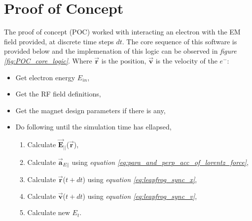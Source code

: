 \documentclass{article}
\begin{document}
\newcommand{\vecthreeBF}[1]{\vec{\textbf{#1}}}
\newcommand{\vecthree}[1]{\vec{#1}}

\newcommand{\parDeriv}[2]{\frac{\partial #1}{\partial #2}}
\newcommand{\parDerivS}[2]{\frac{\partial^2 #1}{\partial #2^2}}
\newcommand{\derivS}[2]{\frac{d^2 #1}{d#2^2}}

\newcommand{\dotProdBF}[2]{\vecthreeBF{#1} \cdot \vecthreeBF{#2}}
\newcommand{\dotProd}[2]{\vecthree{#1} \cdot \vecthree{#2}}

\newcommand{\crossProdBF}[2]{\vecthreeBF{#1} \times \vecthreeBF{#2}}
\newcommand{\crossProd}[2]{\vecthree{#1} \times \vecthree{#2}}


\newcommand{\fromeq}[1]{\textit{equation \ref{eq:#1}}}
\newcommand{\fromeqs}[2]{\textit{equations \ref{eq:#1} and \ref{eq:#2}}}
\newcommand{\fromeqsth}[3]{\textit{equations \ref{eq:#1}, \ref{eq:#2} and \ref{eq:#3}}}

\newcommand{\fromfig}[1]{\textit{figure \ref{fig:#1}}}
\newcommand{\fromfigs}[2]{\textit{figures \ref{fig:#1} and \ref{fig:#2}}}

\newcommand{\fromsec}[1]{\textit{section \ref{sec:#1}}}
\newcommand{\fromsecs}[2]{\textit{sections \ref{sec:#1} and \ref{sec:#2}}}



\section{Proof of Concept}
The proof of concept (POC) worked with interacting an electron with the EM field provided, at discrete time steps $dt$. 
The core sequence of this software is provided below and the implemenation of this logic can be observed in \fromfig{POC_core_logic}. 
Where $\vecthreeBF{r}$ is the position, $\vecthreeBF{v}$ is the velocity of the $e^-$:
\begin{itemize}
    \item Get electron energy $E_{in}$,
    \item Get the RF field definitions,
    \item Get the magnet design parameters if there is any,
    \item Do following until the simulation time has ellapsed,
    \begin{enumerate}
        \item Calculate $\vecthreeBF{E}_{||}$($\vecthreeBF{r}$),
        \item Calculate $\vecthreeBF{a}_{E ||}$ using \fromeq{para_and_perp_acc_of_lorentz_force},
        \item Calculate $\vecthreeBF{r}$($t+dt$) using \fromeq{leapfrog_sync_x},
        \item Calculate $\vecthreeBF{v}$($t+dt$) using \fromeq{leapfrog_sync_v},
        \item Calculate new $E_t$.
    \end{enumerate}
\end{itemize}
\end{document}
